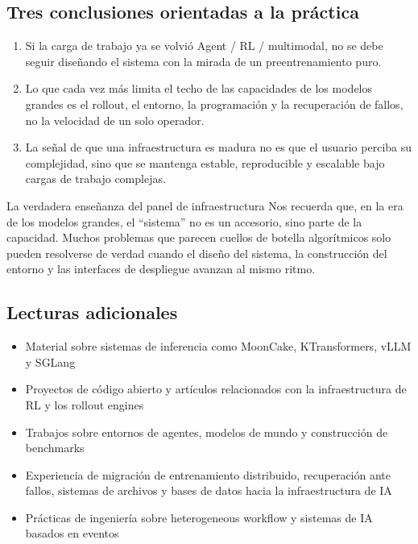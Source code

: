 \documentclass[a4paper]{article}
\begin{document}
\subsection{Tres conclusiones orientadas a la práctica}
\begin{enumerate}
  \item Si la carga de trabajo ya se volvió Agent / RL / multimodal, no se debe seguir diseñando el sistema con la mirada de un preentrenamiento puro.
  \item Lo que cada vez más limita el techo de las capacidades de los modelos grandes es el rollout, el entorno, la programación y la recuperación de fallos, no la velocidad de un solo operador.
  \item La señal de que una infraestructura es madura no es que el usuario perciba su complejidad, sino que se mantenga estable, reproducible y escalable bajo cargas de trabajo complejas.
\end{enumerate}

\begin{importantbox}{La verdadera enseñanza del panel de infraestructura}
Nos recuerda que, en la era de los modelos grandes, el ``sistema'' no es un accesorio, sino parte de la capacidad. Muchos problemas que parecen cuellos de botella algorítmicos solo pueden resolverse de verdad cuando el diseño del sistema, la construcción del entorno y las interfaces de despliegue avanzan al mismo ritmo.
\end{importantbox}

\subsection{Lecturas adicionales}
\begin{itemize}
  \item Material sobre sistemas de inferencia como MoonCake, KTransformers, vLLM y SGLang
  \item Proyectos de código abierto y artículos relacionados con la infraestructura de RL y los rollout engines
  \item Trabajos sobre entornos de agentes, modelos de mundo y construcción de benchmarks
  \item Experiencia de migración de entrenamiento distribuido, recuperación ante fallos, sistemas de archivos y bases de datos hacia la infraestructura de IA
  \item Prácticas de ingeniería sobre heterogeneous workflow y sistemas de IA basados en eventos
\end{itemize}
\end{document}

